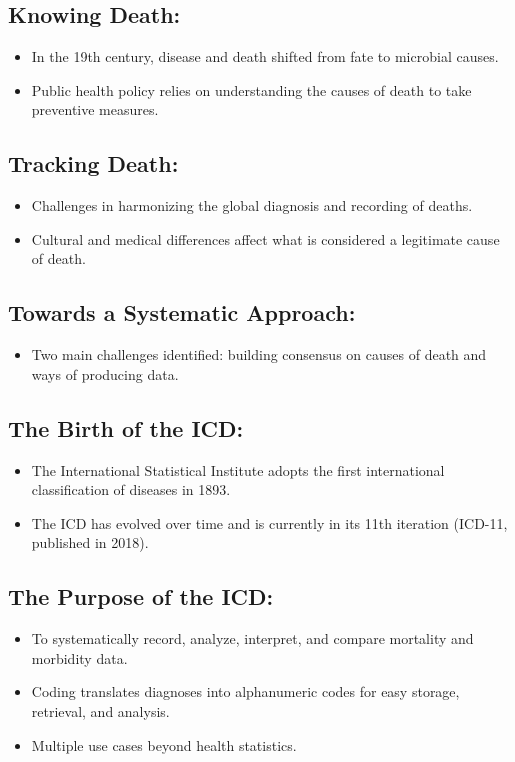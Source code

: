 \documentclass{article}
\begin{document}
\subsection*{Knowing Death:}
\begin{itemize}
  \item In the 19th century, disease and death shifted from fate to microbial causes.
  \item Public health policy relies on understanding the causes of death to take preventive measures.
\end{itemize}

\subsection*{Tracking Death:}
\begin{itemize}
  \item Challenges in harmonizing the global diagnosis and recording of deaths.
  \item Cultural and medical differences affect what is considered a legitimate cause of death.
\end{itemize}

\subsection*{Towards a Systematic Approach:}
\begin{itemize}
  \item Two main challenges identified: building consensus on causes of death and ways of producing data.
\end{itemize}

\subsection*{The Birth of the ICD:}
\begin{itemize}
  \item The International Statistical Institute adopts the first international classification of diseases in 1893.
  \item The ICD has evolved over time and is currently in its 11th iteration (ICD-11, published in 2018).
\end{itemize}

\subsection*{The Purpose of the ICD:}
\begin{itemize}
  \item To systematically record, analyze, interpret, and compare mortality and morbidity data.
  \item Coding translates diagnoses into alphanumeric codes for easy storage, retrieval, and analysis.
  \item Multiple use cases beyond health statistics.
\end{itemize}
\end{document}
